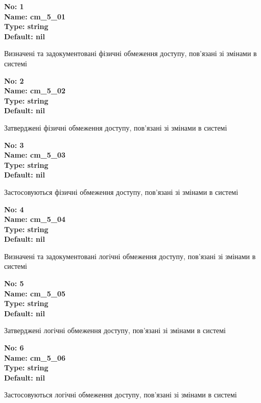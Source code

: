 \documentclass{article}
\begin{document}
\vspace{10pt}
{\footnotesize\bfseries
No: 1\\
Name: cm\_\allowbreak{}5\_\allowbreak{}01\\
Type: string\\
Default: nil
}

{\footnotesize Визначені та задокументовані фізичні обмеження доступу, пов'язані зі змінами в системі}


{\footnotesize\bfseries
No: 2\\
Name: cm\_\allowbreak{}5\_\allowbreak{}02\\
Type: string\\
Default: nil
}

{\footnotesize Затверджені фізичні обмеження доступу, пов'язані зі змінами в системі}


{\footnotesize\bfseries
No: 3\\
Name: cm\_\allowbreak{}5\_\allowbreak{}03\\
Type: string\\
Default: nil
}

{\footnotesize Застосовуються фізичні обмеження доступу, пов'язані зі змінами в системі}


{\footnotesize\bfseries
No: 4\\
Name: cm\_\allowbreak{}5\_\allowbreak{}04\\
Type: string\\
Default: nil
}

{\footnotesize Визначені та задокументовані логічні обмеження доступу, пов'язані зі змінами в системі}


{\footnotesize\bfseries
No: 5\\
Name: cm\_\allowbreak{}5\_\allowbreak{}05\\
Type: string\\
Default: nil
}

{\footnotesize Затверджені логічні обмеження доступу, пов'язані зі змінами в системі}


{\footnotesize\bfseries
No: 6\\
Name: cm\_\allowbreak{}5\_\allowbreak{}06\\
Type: string\\
Default: nil
}

{\footnotesize Застосовуються логічні обмеження доступу, пов'язані зі змінами в системі}
\end{document}
